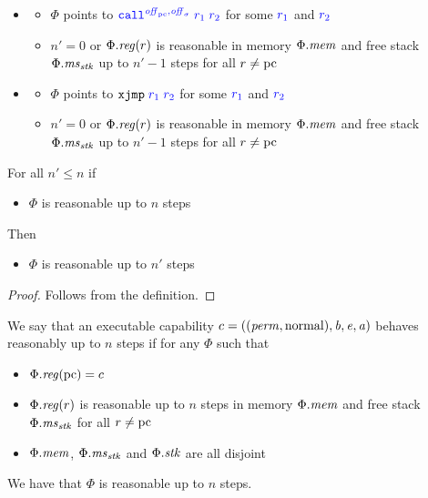 \documentclass[a4paper]{article}
\begin{document}
\begin{definition}
\begin{itemize}
\begin{itemize}
    \item
      \begin{itemize}
      \item $\Phi$ points to $\src{\scall{\offpc,\offsigma}{r_1}{r_2}}$ for some ${\color{blue} r_1}$ and ${\color{blue} r_2}$
      \item $n' = 0$ or $\Phi.\reg(r)$ is reasonable in memory $\Phi.\mathit{mem}$ and free stack $\Phi.\mathit{ms}_{\mathit{stk}}$ up to $n'-1$ steps for all $r \neq \mathrm{pc}$
      \end{itemize}
    \item
      \begin{itemize}
      \item $\Phi$ points to $\src{\txjmp{r_1}{r_2}}$ for some ${\color{blue} r_1}$ and ${\color{blue} r_2}$
      \item $n' = 0$ or $\Phi.\reg(r)$ is reasonable in memory $\Phi.\mathit{mem}$ and free stack $\Phi.\mathit{ms}_{\mathit{stk}}$ up to $n'-1$ steps for all $r \neq \mathrm{pc}$
      \end{itemize}
    \end{itemize}
  \end{itemize}
\end{definition}

  \begin{lemma}
    \label{lem:ec-reasonable-downwards-closed}
    For all $n' \le n$ if
    \begin{itemize}
    \item $\Phi$ is reasonable up to $n$ steps
    \end{itemize}
    Then
    \begin{itemize}
    \item $\Phi$ is reasonable up to $n'$ steps
    \end{itemize}
  \end{lemma}
  \begin{proof}
    Follows from the definition.
  \end{proof}

  \begin{definition}[Reasonable pc]
    \label{def:reasonable-pc}
    We say that an executable capability $c =
    ((\mathit{perm},\mathrm{normal}),\mathit{b},\mathit{e},\mathit{a})$ behaves reasonably up to $n$ steps
    if for any $\Phi$ such that
    \begin{itemize}
    \item $\Phi.\reg(\pcreg) = c$
    \item $\Phi.\reg(r)$ is reasonable up to $n$ steps in memory $\Phi.\mathit{mem}$ and
      free stack $\Phi.\mathit{ms}_{\mathit{stk}}$ for all $r \neq \mathrm{pc}$
    \item $\Phi.\mathit{mem}$, $\Phi.\mathit{ms}_{\mathit{stk}}$ and $\Phi.\mathit{stk}$ are all disjoint
    \end{itemize}
    We have that $\Phi$ is reasonable up to $n$ steps.
  \end{definition}
\end{document}
